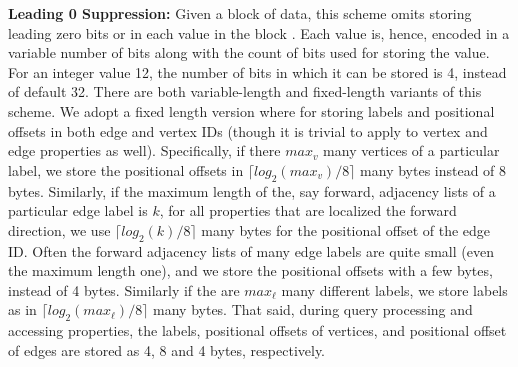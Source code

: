 \noindent  \textbf{Leading 0 Suppression:} Given a block of data, this scheme omits storing leading zero bits or in each value in the block \cite{beckmann:sparse}. Each value is, hence, encoded in a variable number of bits along with the count of bits used for storing the value. For an integer value 12, the number of bits in which it can be stored is 4, instead of default 32. There are both variable-length and fixed-length variants of this scheme. We adopt a fixed length version where for storing labels and positional offsets in both edge and vertex IDs (though it is trivial to apply to vertex and edge properties as well). Specifically, if there $max_v$ many vertices of a particular label, we store the positional offsets in $\lceil log_2(max_v)/8\rceil$ many bytes instead of 8 bytes. Similarly, if the maximum length of the, say forward, adjacency lists of a particular edge label is $k$, for all properties that are localized the forward direction, we use $\lceil log_2(k)/8\rceil$ many bytes for the positional offset of the edge ID. Often the forward adjacency lists of many edge labels are quite small (even the maximum length one), and we store the positional offsets with a few bytes, instead of 4 bytes. Similarly if the are $max_{\ell}$ many different labels, we store labels as in $\lceil log_2(max_{\ell})/8\rceil$ many bytes. That said, during query processing and accessing properties, the  labels, positional offsets of vertices, and positional offset of edges are stored as 4, 8 and 4 bytes, respectively.


	
